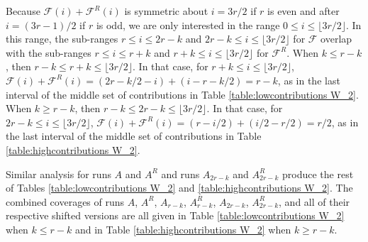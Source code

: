 \documentclass[11pt]{article}
\begin{document}
Because $\mathcal{F}(i) + \mathcal{F}^R(i)$ is symmetric about $i = 3r/2$ if $r$ is even and after $i = (3r - 1)/2$ if $r$ is odd, we are only interested in the range $0 \leq i \leq \lfloor 3r/2 \rfloor$.  In this range, the sub-ranges $r \leq i \leq 2r - k$ and $2r - k \leq i \leq \lfloor 3r/2 \rfloor$ for $\mathcal{F}$ overlap with the sub-ranges $r \leq i \leq r + k$ and $r + k \leq i \leq \lfloor 3r/2 \rfloor$ for $\mathcal{F}^R$.  When $k \leq r - k$, then $r - k \leq r + k \leq \lfloor 3r/2 \rfloor$.  In that case, for $r + k \leq i \leq \lfloor 3r/2 \rfloor$, $\mathcal{F}(i) + \mathcal{F}^R(i) = (2r - k/2 - i) + (i - r - k/2) = r - k$, as in the last interval of the middle set of contributions in Table \ref{table:lowcontributions W_2}. When $k \geq r - k$, then $r - k \leq 2r - k \leq \lfloor 3r/2 \rfloor$.  In that case, for $2r - k \leq i \leq \lfloor 3r/2 \rfloor$, $\mathcal{F}(i) + \mathcal{F}^R(i) = (r - i/2) + (i/2 - r/2) = r/2$, as in the last interval of the middle set of contributions in Table  \ref{table:highcontributions W_2}.

Similar analysis for runs $A$ and $A^R$ and runs $A_{2r - k}$ and $A_{2r - k}^R$ produce the rest of Tables \ref{table:lowcontributions W_2} and \ref{table:highcontributions W_2}.  The combined coverages of runs $A$, $A^R$, $A_{r-k}$, $A_{r-k}^R$, $A_{2r - k}$, $A_{2r - k}^R$, and all of their respective shifted versions are all given in Table \ref{table:lowcontributions W_2} when $k \leq r - k$ and in Table \ref{table:highcontributions W_2} when $k \geq r - k$.
\end{document}
